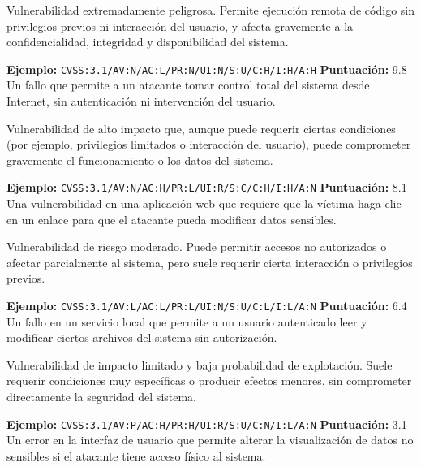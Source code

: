 \documentclass[a4paper, 11pt]{article}
\begin{document}
\begin{tcolorbox}[colback=cvsscritical!10, colframe=cvsscritical!80!black, coltitle=white,
title=Crítica (CVSS 9.0 -- 10.0)]
Vulnerabilidad extremadamente peligrosa. Permite ejecución remota de código sin privilegios previos ni interacción del usuario, y afecta gravemente a la confidencialidad, integridad y disponibilidad del sistema.

\textbf{Ejemplo:}
\texttt{CVSS:3.1/AV:N/AC:L/PR:N/UI:N/S:U/C:H/I:H/A:H}
\textbf{Puntuación:} 9.8
Un fallo que permite a un atacante tomar control total del sistema desde Internet, sin autenticación ni intervención del usuario.
\end{tcolorbox}

\vspace{0.2cm}

\begin{tcolorbox}[colback=cvsshigh!10, colframe=cvsshigh!80!black, coltitle=white,
title=Alta (CVSS 7.0 -- 8.9)]
Vulnerabilidad de alto impacto que, aunque puede requerir ciertas condiciones (por ejemplo, privilegios limitados o interacción del usuario), puede comprometer gravemente el funcionamiento o los datos del sistema.

\textbf{Ejemplo:}
\texttt{CVSS:3.1/AV:N/AC:H/PR:L/UI:R/S:C/C:H/I:H/A:N}
\textbf{Puntuación:} 8.1
Una vulnerabilidad en una aplicación web que requiere que la víctima haga clic en un enlace para que el atacante pueda modificar datos sensibles.
\end{tcolorbox}

\vspace{0.2cm}

\begin{tcolorbox}[colback=cvssmedium!10, colframe=cvssmedium!80!black, coltitle=white,
title=Media (CVSS 4.0 -- 6.9)]
Vulnerabilidad de riesgo moderado. Puede permitir accesos no autorizados o afectar parcialmente al sistema, pero suele requerir cierta interacción o privilegios previos.

\textbf{Ejemplo:}
\texttt{CVSS:3.1/AV:L/AC:L/PR:L/UI:N/S:U/C:L/I:L/A:N}
\textbf{Puntuación:} 6.4
Un fallo en un servicio local que permite a un usuario autenticado leer y modificar ciertos archivos del sistema sin autorización.
\end{tcolorbox}

\vspace{0.2cm}

\begin{tcolorbox}[colback=cvsslow!10, colframe=cvsslow!80!black, coltitle=white,
title=Baja (CVSS 0.1 -- 3.9)]
Vulnerabilidad de impacto limitado y baja probabilidad de explotación. Suele requerir condiciones muy específicas o producir efectos menores, sin comprometer directamente la seguridad del sistema.

\textbf{Ejemplo:}
\texttt{CVSS:3.1/AV:P/AC:H/PR:H/UI:R/S:U/C:N/I:L/A:N}
\textbf{Puntuación:} 3.1
Un error en la interfaz de usuario que permite alterar la visualización de datos no sensibles si el atacante tiene acceso físico al sistema.
\end{tcolorbox}
\end{document}
